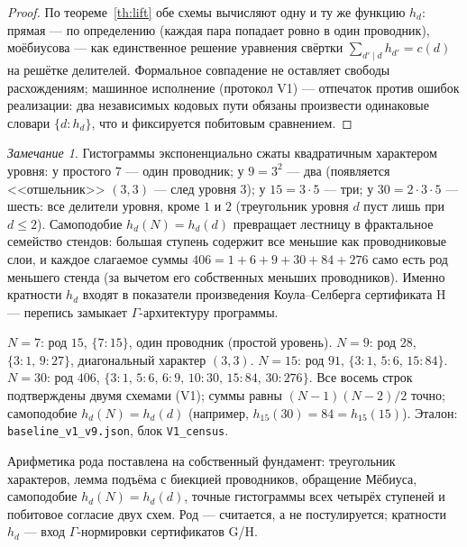 \documentclass[11pt,a4paper]{article}
\theoremstyle{plain}
\theoremstyle{definition}
\theoremstyle{remark}
\newtheorem{remark}[theorem]{Замечание}
\newcommand{\Ga}{\Gamma}
\begin{document}
\begin{proof}
По теореме~\ref{th:lift} обе схемы вычисляют одну и ту же
функцию $h_d$: прямая --- по определению (каждая пара попадает
ровно в один проводник), моёбиусова --- как единственное решение
уравнения свёртки $\sum_{d'\mid d}h_{d'}=c(d)$ на решётке
делителей. Формальное совпадение не оставляет свободы
расхождениям; машинное исполнение (протокол V1) --- отпечаток
против ошибок реализации: два независимых кодовых пути обязаны
произвести одинаковые словари $\{d\colon h_d\}$, что и
фиксируется побитовым сравнением.
\end{proof}

\begin{remark}
Гистограммы экспоненциально сжаты квадратичным характером
уровня: у простого $7$ --- один проводник; у $9=3^2$ --- два
(появляется <<отшельник>> $(3,3)$ --- след уровня $3$); у
$15=3\cdot5$ --- три; у $30=2\cdot3\cdot5$ --- шесть: все делители уровня,
кроме $1$ и $2$ (треугольник уровня $d$ пуст лишь при $d\le2$). Самоподобие
$h_d(N)=h_d(d)$ превращает лестницу в фрактальное семейство
стендов: большая ступень содержит все меньшие как проводниковые
слои, и каждое слагаемое суммы $406=1+6+9+30+84+276$ само есть
род меньшего стенда (за вычетом его собственных меньших
проводников). Именно кратности $h_d$ входят в показатели
произведения Коула--Селберга сертификата H --- перепись замыкает
$\Ga$-архитектуру программы.
\end{remark}

\begin{databox}
$N=7$: род $15$, $\{7\colon15\}$, один проводник (простой
уровень). $N=9$: род $28$, $\{3\colon1,\,9\colon27\}$,
диагональный характер $(3,3)$. $N=15$: род $91$,
$\{3\colon1,\,5\colon6,\,15\colon84\}$. $N=30$: род $406$,
$\{3\colon1,\,5\colon6,\,6\colon9,\,10\colon30,\,15\colon84,\,30\colon276\}$.
Все восемь строк подтверждены двумя схемами (V1); суммы равны
$(N-1)(N-2)/2$ точно; самоподобие $h_d(N)=h_d(d)$ (например,
$h_{15}(30)=84=h_{15}(15)$). Эталон: \texttt{baseline\_v1\_v9.json},
блок \texttt{V1\_census}.
\end{databox}

\begin{statusbox}[итог]
Арифметика рода поставлена на собственный фундамент: треугольник
характеров, лемма подъёма с биекцией проводников, обращение
Мёбиуса, самоподобие $h_d(N)=h_d(d)$, точные гистограммы всех
четырёх ступеней и побитовое согласие двух схем. Род ---
считается, а не постулируется; кратности $h_d$ --- вход
$\Ga$-нормировки сертификатов G/H.
\end{statusbox}
\end{document}
